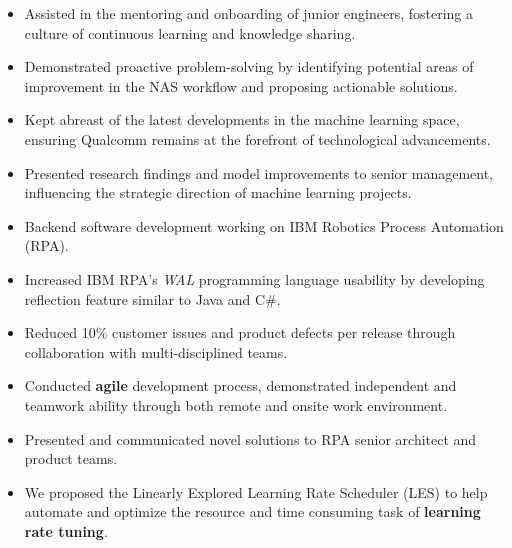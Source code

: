\documentclass[10pt,a4paper,ragged2e,withhyper]{altacv}
\begin{document}
\begin{paracol}{2}
\begin{itemize}
    \item Assisted in the mentoring and onboarding of junior engineers, fostering a culture of continuous learning and knowledge sharing.

    \item Demonstrated proactive problem-solving by identifying potential areas of improvement in the NAS workflow and proposing actionable solutions.

    \item Kept abreast of the latest developments in the machine learning space, ensuring Qualcomm remains at the forefront of technological advancements.

    \item Presented research findings and model improvements to senior management, influencing the strategic direction of machine learning projects.
\end{itemize}


\begin{itemize}
    \item Backend software development working on IBM Robotics Process Automation (RPA).
    
    \item Increased IBM RPA's \textit{WAL} programming language usability by developing reflection feature similar to Java and C\#.
    
    \item Reduced 10\% customer issues and product defects per release through collaboration with multi-disciplined teams. 
 
    \item Conducted \textbf{agile} development process, demonstrated independent and teamwork ability through both remote and onsite work environment. 
    
    \item Presented and communicated novel solutions to RPA senior architect and product teams. 
    
\end{itemize}

\begin{itemize}
    \item  We proposed the Linearly Explored Learning Rate Scheduler (LES) to help automate and optimize the resource and time consuming task of \textbf{learning rate tuning}.
    

\end{itemize}
\end{paracol}
\end{document}
